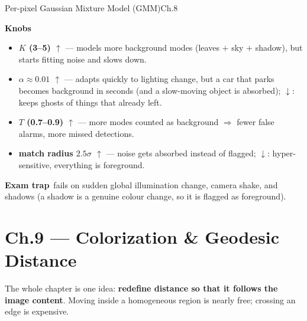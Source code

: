 \documentclass[9pt,a4paper]{extarticle}
\newcommand{\KNOBS}{\par\smallskip\textbf{Knobs}\par\nopagebreak}
\newcommand{\TRAP}{\par\smallskip\textbf{\color{cTrap}Exam trap}\ }
\newcommand{\up}{$\uparrow$}
\newcommand{\dn}{$\downarrow$}
\newcommand{\kn}[2]{\item \textbf{#1} --- #2}
\begin{document}
\begin{card}{Per-pixel Gaussian Mixture Model (GMM)}{Ch.8}
\KNOBS
\begin{itemize}
  \kn{$K$ (3--5) \up}{models more background modes (leaves $+$ sky $+$ shadow), but starts fitting noise and slows down.}
  \kn{$\alpha\approx0.01$ \up}{adapts quickly to lighting change, but a car that parks becomes background in seconds (and a slow-moving object is absorbed); \dn: keeps ghosts of things that already left.}
  \kn{$T$ (0.7--0.9) \up}{more modes counted as background $\Rightarrow$ fewer false alarms, more missed detections.}
  \kn{match radius $2.5\sigma$ \up}{noise gets absorbed instead of flagged; \dn: hyper-sensitive, everything is foreground.}
\end{itemize}
\TRAP fails on sudden global illumination change, camera shake, and shadows (a shadow is a genuine colour change, so it is flagged as foreground).
\end{card}

\section{Ch.9 --- Colorization \& Geodesic Distance}

The whole chapter is one idea: \textbf{redefine distance so that it follows the image content}. Moving inside a homogeneous region is nearly free; crossing an edge is expensive.
\end{document}
